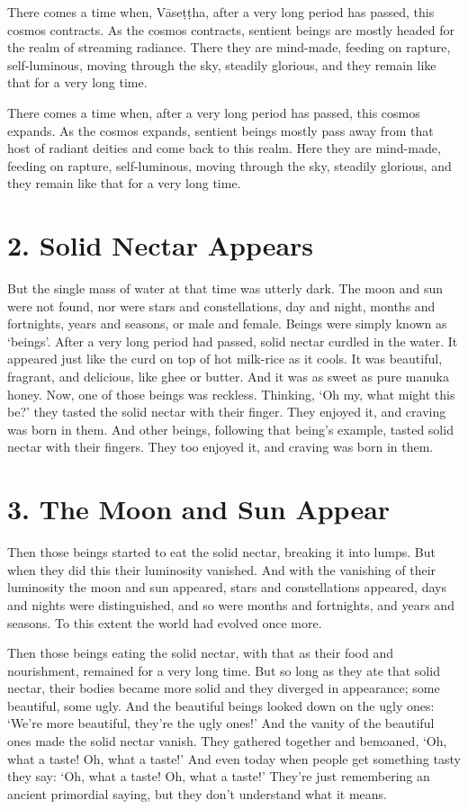 \documentclass[12pt,openany]{book}%
\begin{document}
There comes a time when, \textsanskrit{Vāseṭṭha}, after a very long period has passed, this cosmos contracts. As the cosmos contracts, sentient beings are mostly headed for the realm of streaming radiance. There they are mind-made, feeding on rapture, self-luminous, moving through the sky, steadily glorious, and they remain like that for a very long time. 

There comes a time when, after a very long period has passed, this cosmos expands. As the cosmos expands, sentient beings mostly pass away from that host of radiant deities and come back to this realm. Here they are mind-made, feeding on rapture, self-luminous, moving through the sky, steadily glorious, and they remain like that for a very long time. 

\section*{2. Solid Nectar Appears }

But the single mass of water at that time was utterly dark. The moon and sun were not found, nor were stars and constellations, day and night, months and fortnights, years and seasons, or male and female. Beings were simply known as ‘beings’. After a very long period had passed, solid nectar curdled in the water. It appeared just like the curd on top of hot milk-rice as it cools. It was beautiful, fragrant, and delicious, like ghee or butter. And it was as sweet as pure manuka honey. Now, one of those beings was reckless. Thinking, ‘Oh my, what might this be?’ they tasted the solid nectar with their finger. They enjoyed it, and craving was born in them. And other beings, following that being’s example, tasted solid nectar with their fingers. They too enjoyed it, and craving was born in them. 

\section*{3. The Moon and Sun Appear }

Then those beings started to eat the solid nectar, breaking it into lumps. But when they did this their luminosity vanished. And with the vanishing of their luminosity the moon and sun appeared, stars and constellations appeared, days and nights were distinguished, and so were months and fortnights, and years and seasons. To this extent the world had evolved once more. 

Then those beings eating the solid nectar, with that as their food and nourishment, remained for a very long time. But so long as they ate that solid nectar, their bodies became more solid and they diverged in appearance; some beautiful, some ugly. And the beautiful beings looked down on the ugly ones: ‘We’re more beautiful, they’re the ugly ones!’ And the vanity of the beautiful ones made the solid nectar vanish. They gathered together and bemoaned, ‘Oh, what a taste! Oh, what a taste!’ And even today when people get something tasty they say: ‘Oh, what a taste! Oh, what a taste!’ They’re just remembering an ancient primordial saying, but they don’t understand what it means. 
\end{document}
